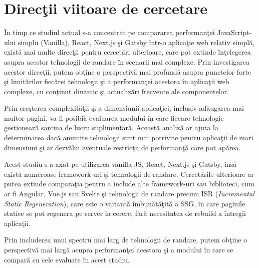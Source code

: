 \documentclass[12pt, a4paper]{report}
\begin{document}
\section {Direc\c tii viitoare de cercetare}

\^In timp ce studiul actual s-a concentrat pe compararea performan\c tei JavaScript-ului simplu (Vanilla), React, Next.js \c si Gatsby \^intr-o aplica\c tie web relativ simpl\u a, exist\u a mai multe direc\c tii pentru cercet\u ari ulterioare, care pot extinde \^in\c telegerea asupra acestor tehnologii de randare \^in scenarii mai complexe. Prin investigarea acestor direc\c tii, putem ob\c tine o perspectiv\u a mai profund\u a asupra punctelor forte \c si limit\u arilor fiec\u arei tehnologii \c si a performan\c tei acestora \^in aplica\c tii web complexe, cu con\c tinut dinamic \c si actualiz\u ari frecvente ale componentelor.

Prin cre\c sterea complexit\u a\c tii \c si a dimensiunii aplica\c tiei, inclusiv ad\u augarea mai multor pagini, va fi posibi\u a evaluarea modului \^in care fiecare tehnologie gestioneaz\u a sarcina de lucru suplimentar\u a. Aceast\u a analiz\u a ar ajuta la determinarea dac\u a anumite tehnologii sunt mai potrivite pentru aplica\c tii de mari dimensiuni \c si ar dezv\u alui eventuale restric\c tii de performan\c t\u a care pot ap\u area.

Acest studiu s-a axat pe utilizarea vanilla JS, React, Next.js \c si Gatsby, \^ins\u a exist\u a numeroase framework-uri \c si tehnologii de randare. Cercet\u arile ulterioare ar putea extinde compara\c tia pentru a include alte framework-uri sau biblioteci, cum ar fi Angular, Vue.js sau Svelte \c si tehnologii de randare precum ISR (\textit{Incremental Static Regeneration}), care este o variant\u a \^imbun\u at\u a\c tit\u a a SSG, \^in care paginile statice se pot regenera pe server la cerere, f\u ar\u a necesitatea de rebuild a \^intregii aplica\c tii. 

Prin includerea unui spectru mai larg de tehnologii de randare, putem ob\c tine o perspectiv\u a mai larg\u a asupra performan\c tei acestora \c si a modului \^in care se compar\u a cu cele evaluate \^in acest studiu.



\renewcommand{\bibname}{Bibliografie}

\end{document}

